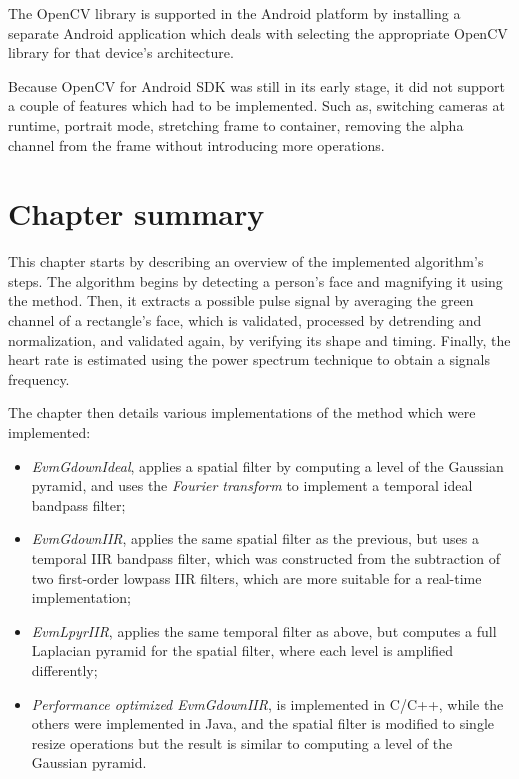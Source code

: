 The OpenCV library is supported in the Android platform by installing
a separate Android application which deals with selecting the appropriate
OpenCV library for that device's architecture.

Because OpenCV for Android SDK was still in its early stage, it did not support
a couple of features which had to be implemented. Such as, switching cameras at
runtime, portrait mode, stretching frame to container, removing the alpha
channel from the frame without introducing more operations.

\section{Chapter summary}

This chapter starts by describing an overview of the implemented algorithm's
steps. The algorithm begins by detecting a person's face and magnifying it
using the \evm{} method. Then, it extracts a possible pulse signal by averaging
the green channel of a rectangle's face, which is validated, processed by
detrending and normalization, and validated again, by verifying its shape
and timing. Finally, the heart rate is estimated using the power spectrum
technique to obtain a signals frequency.

The chapter then details various implementations of the \evm{} method
which were implemented:
\begin{itemize}
  \item \emph{EvmGdownIdeal}, applies a spatial filter by computing a level
        of the Gaussian pyramid, and uses the \emph{Fourier transform} to
        implement a temporal ideal bandpass filter;
  \item \emph{EvmGdownIIR}, applies the same spatial filter as the previous,
        but uses a temporal IIR bandpass filter, which was constructed from
        the subtraction of two first-order lowpass IIR filters, which are more
        suitable for a real-time implementation;
  \item \emph{EvmLpyrIIR}, applies the same temporal filter as above, but
        computes a full Laplacian pyramid for the spatial filter, where each
        level is amplified differently;
  \item \emph{Performance optimized EvmGdownIIR}, is implemented in C/C++,
        while the others were implemented in Java, and the spatial filter
        is modified to single resize operations but the result is similar
        to computing a level of the Gaussian pyramid.
\end{itemize}

